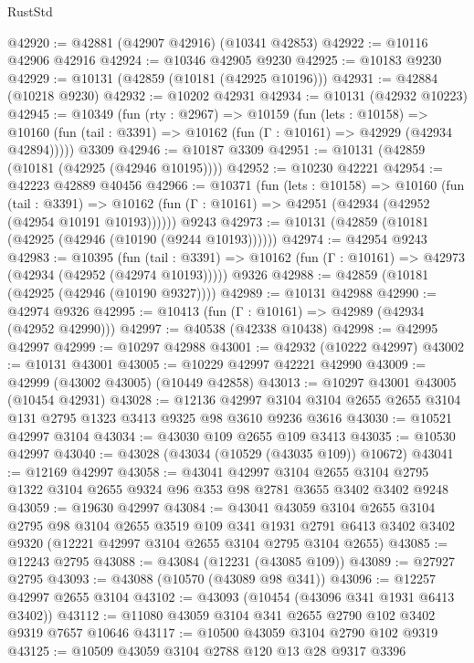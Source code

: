 \begin{lexlean}{RustStd}
\begin{coremodule}
@42920 := @42881 (@42907 @42916) (@10341 @42853)
@42922 := @10116 @42906 @42916
@42924 := @10346 @42905 @9230
@42925 := @10183 @9230
@42929 := @10131 (@42859 (@10181 (@42925 @10196)))
@42931 := @42884 (@10218 @9230)
@42932 := @10202 @42931
@42934 := @10131 (@42932 @10223)
@42945 := @10349
    (fun (rty : @2967) =>
    @10159
      (fun (lets : @10158) =>
      @10160 (fun (tail : @3391) => @10162 (fun (Γ : @10161) => @42929 (@42934 @42894)))))
    @3309
@42946 := @10187 @3309
@42951 := @10131 (@42859 (@10181 (@42925 (@42946 @10195))))
@42952 := @10230 @42221
@42954 := @42223 @42889 @40456
@42966 := @10371
    (fun (lets : @10158) =>
    @10160
      (fun (tail : @3391) =>
      @10162 (fun (Γ : @10161) => @42951 (@42934 (@42952 (@42954 @10191 @10193))))))
    @9243
@42973 := @10131 (@42859 (@10181 (@42925 (@42946 (@10190 (@9244 @10193))))))
@42974 := @42954 @9243
@42983 := @10395
    (fun (tail : @3391) => @10162 (fun (Γ : @10161) => @42973 (@42934 (@42952 (@42974 @10193)))))
    @9326
@42988 := @42859 (@10181 (@42925 (@42946 (@10190 @9327))))
@42989 := @10131 @42988
@42990 := @42974 @9326
@42995 := @10413 (fun (Γ : @10161) => @42989 (@42934 (@42952 @42990)))
@42997 := @40538 (@42338 @10438)
@42998 := @42995 @42997
@42999 := @10297 @42988
@43001 := @42932 (@10222 @42997)
@43002 := @10131 @43001
@43005 := @10229 @42997 @42221 @42990
@43009 := @42999 (@43002 @43005) (@10449 @42858)
@43013 := @10297 @43001 @43005 (@10454 @42931)
@43028 := @12136
    @42997
    @3104
    @3104
    @2655
    @2655
    @3104
    @131
    @2795
    @1323
    @3413
    @9325
    @98
    @3610
    @9236
    @3616
@43030 := @10521 @42997 @3104
@43034 := @43030 @109 @2655 @109 @3413
@43035 := @10530 @42997
@43040 := @43028 (@43034 (@10529 (@43035 @109)) @10672)
@43041 := @12169 @42997
@43058 := @43041
    @42997
    @3104
    @2655
    @3104
    @2795
    @1322
    @3104
    @2655
    @9324
    @96
    @353
    @98
    @2781
    @3655
    @3402
    @3402
    @9248
@43059 := @19630 @42997
@43084 := @43041
    @43059
    @3104
    @2655
    @3104
    @2795
    @98
    @3104
    @2655
    @3519
    @109
    @341
    @1931
    @2791
    @6413
    @3402
    @3402
    @9320
    (@12221 @42997 @3104 @2655 @3104 @2795 @3104 @2655)
@43085 := @12243 @2795
@43088 := @43084 (@12231 (@43085 @109))
@43089 := @27927 @2795
@43093 := @43088 (@10570 (@43089 @98 @341))
@43096 := @12257 @42997 @2655 @3104
@43102 := @43093 (@10454 (@43096 @341 @1931 @6413 @3402))
@43112 := @11080 @43059 @3104 @341 @2655 @2790 @102 @3402 @9319 @7657 @10646
@43117 := @10500 @43059 @3104 @2790 @102 @9319
@43125 := @10509 @43059 @3104 @2788 @120 @13 @28 @9317 @3396

\end{coremodule}
\end{lexlean}
